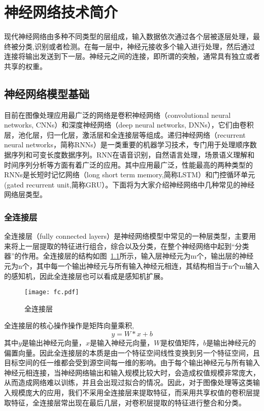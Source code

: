 \chapter{神经网络技术简介}

现代神经网络由多种不同类型的层组成，输入数据依次通过各个层被逐层处理，最终被分类,识别或者检测。在每一层中，神经元接收多个输入进行处理，然后通过连接将输出发送到下一层。神经元之间的连接，即所谓的突触，通常具有独立或者共享的权重。



\section{神经网络模型基础}
目前在图像处理应用最广泛的网络是卷积神经网络（convolutional neural networks, CNNs）和深度神经网络（deep neural networks, DNNs），它们由卷积层，池化层，归一化层，激活层和全连接层等组成。递归神经网络（recurrent neural networks，简称RNNs）是一类重要的机器学习技术，专门用于处理顺序数据序列和可变长度数据序列。RNN在语音识别，自然语言处理，场景语义理解和时间序列分析等方面有着广泛的应用。其中应用最广泛，性能最高的两种类型的RNNs是长短时记忆网络（long short term memory,简称LSTM）和门控循环单元(gated recurrent unit,简称GRU）。下面将为大家介绍神经网络中几种常见的神经网络层类型。

\subsection{全连接层}
全连接层（fully connected layers）是神经网络模型中常见的一种层类型，主要用来将上一层提取的特征进行组合，综合以及分类，在整个神经网络中起到“分类器”的作用。全连接层的结构如图~\ref{fig:fc_layer}所示，输入层神经元为m个，输出层的神经元为n个，其中每一个输出神经元与所有输入神经元相连，其结构相当于n个m输入的感知机，因此全连接层也可以看成是感知机扩展。 
\begin{figure}
  \centering
  \texttt{[image: fc.pdf]}
  \caption{\footnotesize 全连接层}
  \label{fig:fc_layer}
\end{figure}


全连接层的核心操作操作是矩阵向量乘积,
\begin{equation}
y=W*x+b
\end{equation}
其中$y$是输出神经元向量，$x$是输入神经元向量，$W$是权值矩阵，$b$是输出神经元的偏置向量。因此全连接层的本质是由一个特征空间线性变换到另一个特征空间，且目标空间的任一维都会受到源空间每一维的影响。由于每个输出神经元与所有输入神经元相连接，当神经网络输出和输入规模比较大时，会造成权值规模非常庞大，从而造成网络难以训练，并且会出现过拟合的情况。因此，对于图像处理等这类输入规模庞大的应用，我们不采用全连接层来提取特征，而采用共享权值的卷积层提取特征，全连接层常出现在最后几层，对卷积层提取的特征进行整合和分类。

